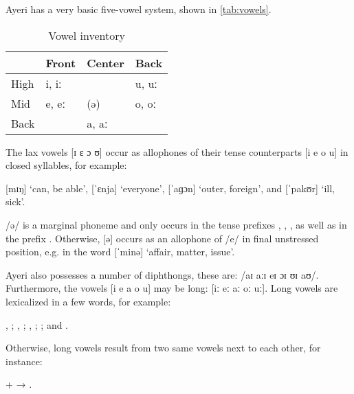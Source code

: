 Ayeri has a very basic five-vowel system, shown in \autoref{tab:vowels}.

\begin{table}[ht]\centering
\caption{Vowel inventory}
\begin{tabu} to .5\textwidth{H X[c] X[c] X[c]}
\toprule\tableheaderfont

	& Front
	& Center
	& Back
	\\

\toprule

High
	& i, iː
	&
	& u, uː
	\\

Mid
	& e, eː
	& (ə)
	& o, oː
	\\

Back
	&
	& a, aː
	&
	\\

\bottomrule
\end{tabu}
\label{tab:vowels}
\end{table}

The lax vowels [ɪ ɛ ɔ ʊ] occur as allophones of their tense counterparts 
[i e o u] in closed syllables, for example:

\pex
	\a {} [mɪŋ] `can, be able',
	\a {} [ˈɛnja] `everyone',
	\a {} [ˈaɡɔn] `outer, foreign', and
	\a {} [ˈpakʊr] `ill, sick'.
\xe

/ə/ is a marginal phoneme and only occurs in the tense prefixes 
, , , as 
well as in the prefix . Otherwise, [ə] occurs 
as an allophone of /e/ in final unstressed position, e.g. in the word 
 [ˈminə] `affair, matter, issue'.

Ayeri also possesses a number of diphthongs, these are: /aɪ aːɪ eɪ ɔɪ ʊɪ aʊ/.
Furthermore, the vowels [i e a o u] may be long: [iː eː aː oː uː]. Long vowels 
are lexicalized in a few words, for example:

\pex
	\a {}, ;
	\a {}, ;
	\a {}, ; \label{ex:laa}
	\a {}; and 
	\a {}.
\xe

\noindent Otherwise, long vowels result from two same vowels next to each other, 
for instance:

\ex {} +  → . \xe


